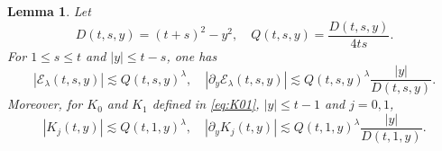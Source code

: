 \documentclass[11pt,twoside]{article}
\newcommand{\p}{\partial}
\newcommand{\f}{\frac}
\newcommand{\Ecal}{\mathcal E}
\theoremstyle{plain}
\newtheorem{lemma}[theorem]{Lemma}
\theoremstyle{definition}
\theoremstyle{remark}
\numberwithin{equation}{section}
\begin{document}
\begin{lemma}
\label{lem:kernel-pointwise}
Let
\begin{equation}\label{QQ-21'}
D(t,s,y)=(t+s)^2-y^2,
\quad
Q(t,s,y)=\f{D(t,s,y)}{4ts}.
\end{equation}
For $1\leq s\leq t$ and $|y|\leq t-s$, one has
\begin{equation}\label{QQ-20}
|\Ecal_\lambda(t,s,y)|
\lesssim Q(t,s,y)^\lambda,
\quad
|\p_y\Ecal_\lambda(t,s,y)|
\lesssim
Q(t,s,y)^\lambda\f{|y|}{D(t,s,y)}.
\end{equation}
Moreover, for $K_0$ and $K_1$ defined in \eqref{eq:K01},
$|y|\leq t-1$ and $j=0,1$,
\begin{equation}\label{QQ-21}
|K_j(t,y)|
\lesssim Q(t,1,y)^\lambda,
\quad
|\p_yK_j(t,y)|
\lesssim
Q(t,1,y)^\lambda\f{|y|}{D(t,1,y)}.
\end{equation}
\end{lemma}
\end{document}
